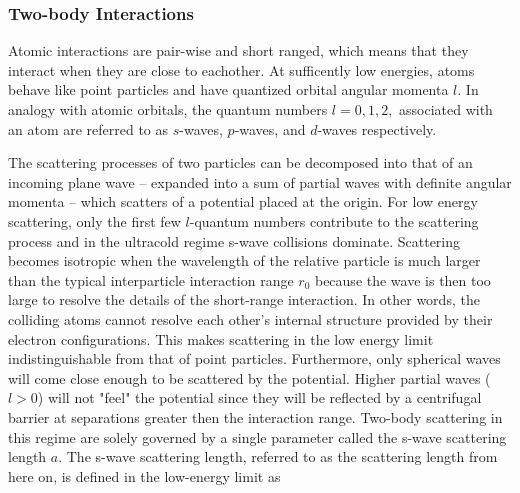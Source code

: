 \documentclass{article}
\numberwithin{equation}{section}
\numberwithin{figure}{section}
\begin{document}
\subsubsection{Two-body Interactions}
Atomic interactions are pair-wise and short ranged, which means that they interact when they are close to eachother. At sufficently low energies, atoms behave like point particles and have quantized orbital angular momenta $l$. In analogy with atomic orbitals, the quantum numbers $l=0,1,2,$ associated with an atom are referred to as $s$-waves, $p$-waves, and $d$-waves respectively. 

The scattering processes of two particles can be decomposed into that of an incoming plane wave -- expanded into a sum of partial waves with definite angular momenta -- which scatters of a potential placed at the origin. For low energy scattering, only the first few $l$-quantum numbers contribute to the scattering process and in the ultracold regime s-wave collisions dominate. Scattering becomes isotropic when the wavelength of the relative particle is much larger than the typical interparticle interaction range $r_0$ because the wave is then too large to resolve the details of the short-range interaction. In other words, the colliding atoms cannot resolve each other's internal structure provided by their electron configurations. This makes scattering in the low energy limit indistinguishable from that of point particles. Furthermore, only spherical waves will come close enough to be scattered by the potential. Higher partial waves ($l>0$) will not "feel" the potential since they will be reflected by a centrifugal barrier at separations greater then the interaction range. Two-body scattering in this regime are solely governed by a single parameter called the s-wave scattering length $a$. The s-wave scattering length, referred to as the scattering length from here on, is defined in the low-energy limit as
\end{document}

